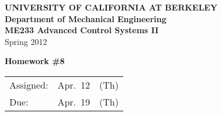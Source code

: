 \documentclass[letterpaper,12pt]{article}
\begin{document}
\begin{center}
    {\bf UNIVERSITY OF CALIFORNIA AT BERKELEY}\\
    {\bf Department of Mechanical Engineering}\\
    {\bf ME233 Advanced Control Systems II}\\
    Spring 2012\\
\end{center}
\noindent
{\Large \bf Homework \#8 }\\[-3em]
\begin{flushright}
\begin{tabular} {lll}
    Assigned: &  Apr.\ 12 & (Th) \\
    Due: & Apr.\ 19 & (Th)
\end{tabular}
\end{flushright}

\begin{enumerate}


\newpage

\newpage


\end{enumerate}
\end{document}
